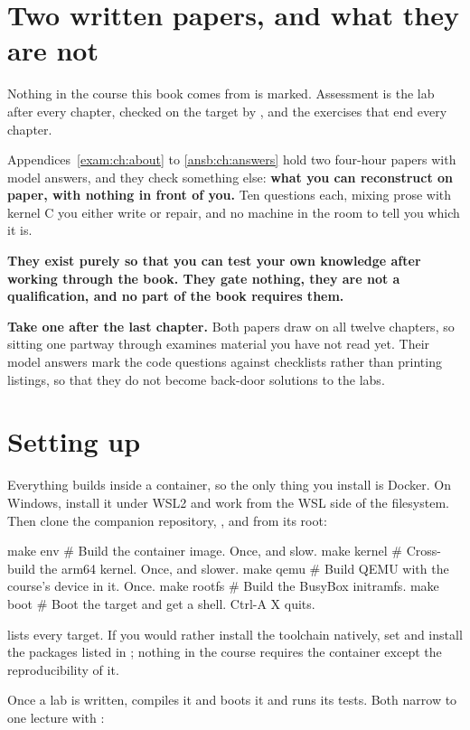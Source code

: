 \section*{Two written papers, and what they are not}
Nothing in the course this book comes from is marked. Assessment is the lab after every chapter,
checked on the target by , and the exercises that end every chapter.

Appendices~\ref{exam:ch:about} to \ref{ansb:ch:answers} hold two four-hour papers with model
answers, and they check something else: \textbf{what you can reconstruct on paper, with nothing in
front of you.} Ten questions each, mixing prose with kernel C you either write or repair, and no
machine in the room to tell you which it is.

\textbf{They exist purely so that you can test your own knowledge after working through the book.
They gate nothing, they are not a qualification, and no part of the book requires them.}

\textbf{Take one after the last chapter.} Both papers draw on all twelve chapters, so sitting one
partway through examines material you have not read yet. Their model answers mark the code
questions against checklists rather than printing listings, so that they do not become back-door
solutions to the labs.

\section*{Setting up}
Everything builds inside a container, so the only thing you install is Docker. On Windows, install
it under WSL2 and work from the WSL side of the filesystem. Then clone the companion repository,
\repo, and from its root:

\begin{shell}
make env       # Build the container image. Once, and slow.
make kernel    # Cross-build the arm64 kernel. Once, and slower.
make qemu      # Build QEMU with the course's device in it. Once.
make rootfs    # Build the BusyBox initramfs.
make boot      # Boot the target and get a shell. Ctrl-A X quits.
\end{shell}

\noindent{} lists every target. If you would rather install the toolchain natively,
set  and install the packages listed in ; nothing
in the course requires the container except the reproducibility of it.

Once a lab is written,  compiles it and  boots it and runs its
tests. Both narrow to one lecture with :


